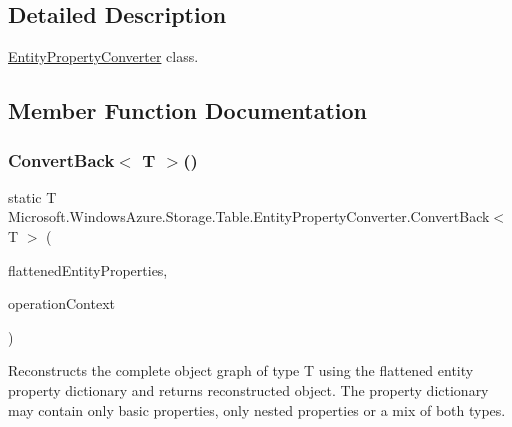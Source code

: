 \subsection{Detailed Description}
\hyperlink{classMicrosoft_1_1WindowsAzure_1_1Storage_1_1Table_1_1EntityPropertyConverter}{Entity\+Property\+Converter} class. 



\subsection{Member Function Documentation}
\mbox{\label{classMicrosoft_1_1WindowsAzure_1_1Storage_1_1Table_1_1EntityPropertyConverter_afb4edd95dfd79d576091119b5ac13ad7_afb4edd95dfd79d576091119b5ac13ad7}} 
\subsubsection{\texorpdfstring{Convert\+Back$<$ T $>$()}{ConvertBack< T >()}\hspace{0.1cm}{\footnotesize\ttfamily [1/2]}}
{\footnotesize\ttfamily static T Microsoft.\+Windows\+Azure.\+Storage.\+Table.\+Entity\+Property\+Converter.\+Convert\+Back$<$ T $>$ (\begin{DoxyParamCaption}\item[{I\+Dictionary$<$ string, Entity\+Property $>$}]{flattened\+Entity\+Properties,  }\item[{Operation\+Context}]{operation\+Context }\end{DoxyParamCaption})\hspace{0.3cm}{\ttfamily [static]}}



Reconstructs the complete object graph of type T using the flattened entity property dictionary and returns reconstructed object. The property dictionary may contain only basic properties, only nested properties or a mix of both types. 


